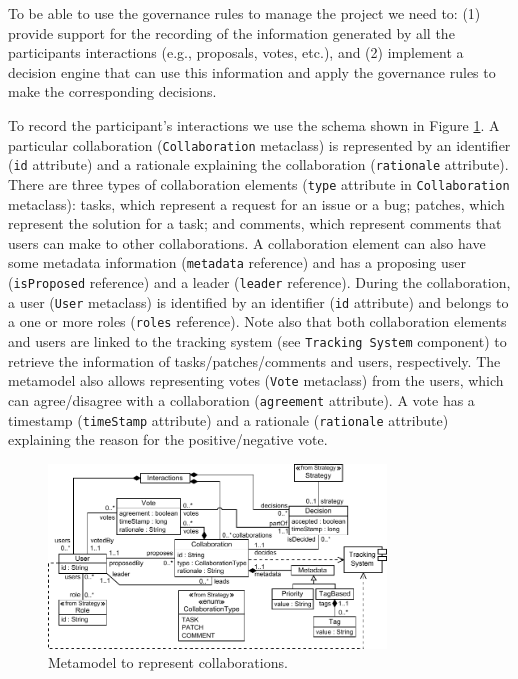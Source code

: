 To be able to use the governance rules to manage the project we need to: (1) provide support for the recording of the information generated by all the participants interactions (e.g., proposals, votes, etc.), and (2) implement a decision engine that can use this information and apply the governance rules to make the corresponding decisions. 

To record the participant's interactions we use the schema shown in Figure \ref{fig:collaboration}. A particular collaboration (\texttt{Collaboration} metaclass) is represented by an identifier (\texttt{id} attribute) and a rationale explaining the collaboration (\texttt{rationale} attribute). There are three types of collaboration elements (\texttt{type} attribute in \texttt{Collaboration} metaclass): tasks, which represent a request for an issue or a bug; patches, which represent the solution for a task; and comments, which represent comments that users can make to other collaborations. A collaboration element can also have some metadata information (\texttt{metadata} reference) and has a proposing user (\texttt{isProposed} reference) and a leader (\texttt{leader} reference). During the collaboration, a user (\texttt{User} metaclass) is identified by an identifier (\texttt{id} attribute) and belongs to a one or more roles (\texttt{roles} reference).  Note also that both collaboration elements and users are linked to the tracking system (see \texttt{Tracking System} component) to retrieve the information of tasks/patches/comments and users, respectively. The metamodel also allows representing votes (\texttt{Vote} metaclass) from the users, which can agree/disagree with a collaboration (\texttt{agreement} attribute). A vote has a timestamp (\texttt{timeStamp} attribute) and a rationale (\texttt{rationale} attribute) explaining the reason for the positive/negative vote. 


\begin{figure}[!t] 
  \centering
  \includegraphics[width=0.8\textwidth]{./figures/collaboration}
  \caption{Metamodel to represent collaborations.}
  \label{fig:collaboration}
\end{figure}

